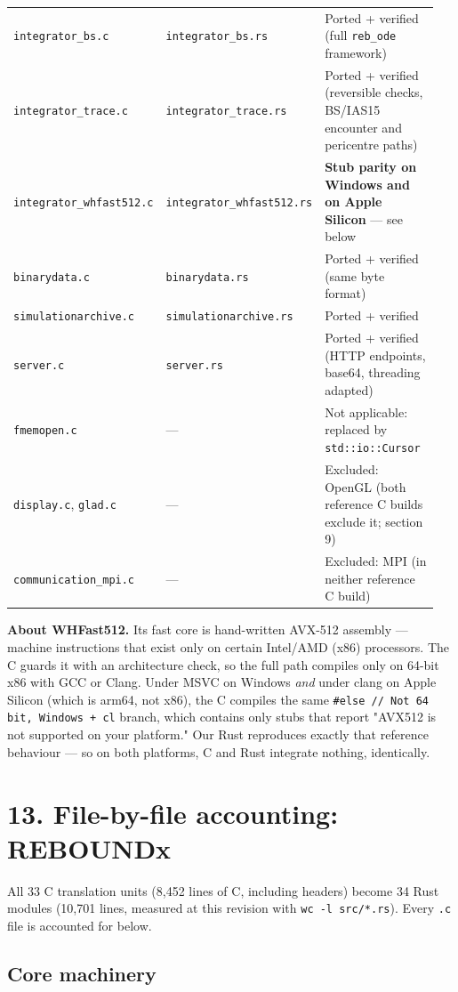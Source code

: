 \documentclass[11pt]{article}
\begin{document}
\begin{longtable}{L{0.171\linewidth}L{0.099\linewidth}L{0.679\linewidth}}
\texttt{integrator\_bs.c} & \texttt{integrator\_bs.rs} & Ported + verified (full \texttt{reb\_ode} framework) \\
\texttt{integrator\_trace.c} & \texttt{integrator\_trace.rs} & Ported + verified (reversible checks, BS/IAS15 encounter and pericentre paths) \\
\texttt{integrator\_whfast512.c} & \texttt{integrator\_whfast512.rs} & \textbf{Stub parity on Windows and on Apple Silicon} --- see below \\
\texttt{binarydata.c} & \texttt{binarydata.rs} & Ported + verified (same byte format) \\
\texttt{simulationarchive.c} & \texttt{simulationarchive.rs} & Ported + verified \\
\texttt{server.c} & \texttt{server.rs} & Ported + verified (HTTP endpoints, base64, threading adapted) \\
\texttt{fmemopen.c} & --- & Not applicable: replaced by \texttt{std::io::Cursor} \\
\texttt{display.c}, \texttt{glad.c} & --- & Excluded: OpenGL (both reference C builds exclude it; section 9) \\
\texttt{communication\_mpi.c} & --- & Excluded: MPI (in neither reference C build) \\
\bottomrule
\end{longtable}

\textbf{About WHFast512.} Its fast core is hand-written AVX-512 assembly --- machine instructions that exist only on certain Intel/AMD (x86) processors. The C guards it with an architecture check, so the full path compiles only on 64-bit x86 with GCC or Clang. Under MSVC on Windows \emph{and} under clang on Apple Silicon (which is arm64, not x86), the C compiles the same \texttt{\#else // Not 64 bit, Windows + cl} branch, which contains only stubs that report "AVX512 is not supported on your platform." Our Rust reproduces exactly that reference behaviour --- so on both platforms, C and Rust integrate nothing, identically.

\section{13. File-by-file accounting: REBOUNDx}

All 33 C translation units (8,452 lines of C, including headers) become 34 Rust modules (10,701 lines, measured at this revision with \texttt{wc -l src/*.rs}). Every \texttt{.c} file is accounted for below.

\subsection{Core machinery}
\end{document}
